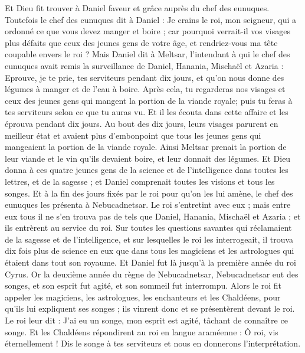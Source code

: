 \begin{multicols}{2}
Et Dieu fit trouver à Daniel faveur et grâce auprès du chef des eunuques. 
Toutefois le chef des eunuques dit à Daniel : Je crains le roi, mon seigneur, qui a ordonné ce que vous devez manger et boire ; car pourquoi verrait-il vos visages plus défaits que ceux des jeunes gens de votre âge, et rendriez-vous ma tête coupable envers le roi ?
Mais Daniel dit à Meltsar, l'intendant à qui le chef des eunuques avait remis la surveillance de Daniel, Hanania, Mischaël et Azaria :
Eprouve, je te prie, tes serviteurs pendant dix jours, et qu'on nous donne des légumes à manger et de l'eau à boire.
Après cela, tu regarderas nos visages et ceux des jeunes gens qui mangent la portion de la viande royale; puis tu feras à tes serviteurs selon ce que tu auras vu.
Et il les écouta dans cette affaire et les éprouva pendant dix jours.
Au bout des dix jours, leurs visages parurent en meilleur état et avaient plus d'embonpoint que tous les jeunes gens qui mangeaient la portion de la viande royale.
 Ainsi Meltsar prenait la portion de leur viande et le vin qu'ils devaient boire, et leur donnait des légumes.
Et Dieu donna à ces quatre jeunes gens de la science et de l'intelligence dans toutes les lettres, et de la sagesse ; et Daniel comprenait toutes les visions et tous les songes.
Et à la fin des jours fixés par le roi pour qu'on les lui amène, le chef des eunuques les présenta à Nebucadnetsar.
Le roi s'entretint avec eux ; mais entre eux tous il ne s'en trouva pas de tels que Daniel, Hanania, Mischaël et Azaria ; et ils entrèrent au service du roi.
Sur toutes les questions savantes qui réclamaient de la sagesse et de l'intelligence, et sur lesquelles le roi les interrogeait, il trouva dix fois plus de science en eux que dans tous les magiciens et les astrologues qui étaient dans tout son royaume.
Et Daniel fut là jusqu'à la première année du roi Cyrus.
\VerseOne{}Or la deuxième année du règne de Nebucadnetsar, Nebucadnetsar eut des songes, et son esprit fut agité, et son sommeil fut interrompu.
Alors le roi fit appeler les magiciens, les astrologues, les enchanteurs et les Chaldéens, pour qu'ils lui expliquent ses songes ; ils vinrent donc et se présentèrent devant le roi.
Le roi leur dit : J'ai eu un songe, mon esprit est agité, tâchant de connaître ce songe.
Et les Chaldéens répondirent au roi en langue araméenne : Ô roi, vis éternellement ! Dis le songe à tes serviteurs et nous en donnerons l'interprétation.

\end{multicols}
